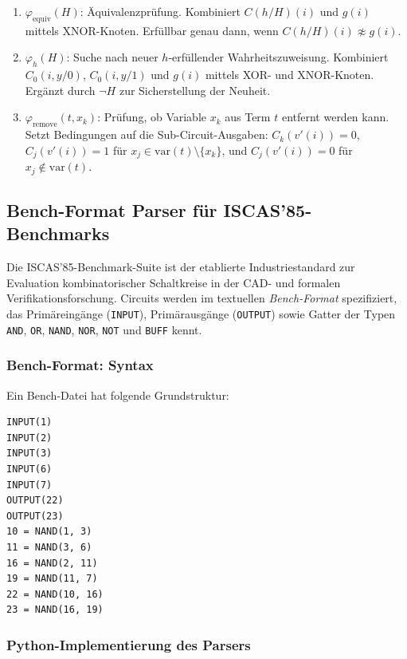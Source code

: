 ﻿\documentclass[a4paper,12pt]{article}
\theoremstyle{definition}
\begin{document}
\begin{enumerate}
    \item \textbf{$\varphi_{\text{equiv}}(H)$}: Äquivalenzprüfung. Kombiniert $C(h/H)(i)$ und $g(i)$ mittels XNOR-Knoten. Erfüllbar genau dann, wenn $C(h/H)(i) \not\approx g(i)$.
    
    \item \textbf{$\varphi_h(H)$}: Suche nach neuer $h$-erfüllender Wahrheitszuweisung. Kombiniert $C_0(i, y/0)$, $C_0(i, y/1)$ und $g(i)$ mittels XOR- und XNOR-Knoten. Ergänzt durch $\neg H$ zur Sicherstellung der Neuheit.
    
    \item \textbf{$\varphi_{\text{remove}}(t, x_k)$}: Prüfung, ob Variable $x_k$ aus Term $t$ entfernt werden kann. Setzt Bedingungen auf die Sub-Circuit-Ausgaben: $C_k(v'(i)) = 0$, $C_j(v'(i)) = 1$ für $x_j \in \text{var}(t) \setminus \{x_k\}$, und $C_j(v'(i)) = 0$ für $x_j \notin \text{var}(t)$.
\end{enumerate}

\subsection{Bench-Format Parser für ISCAS'85-Benchmarks}
\label{subsec:bench-parser}

Die ISCAS'85-Benchmark-Suite \cite{Brglez85} ist der etablierte Industriestandard
zur Evaluation kombinatorischer Schaltkreise in der CAD- und formalen
Verifikationsforschung.  Circuits werden im textuellen \emph{Bench-Format}
spezifiziert, das Primäreingänge (\texttt{INPUT}), Primärausgänge
(\texttt{OUTPUT}) sowie Gatter der Typen \texttt{AND}, \texttt{OR},
\texttt{NAND}, \texttt{NOR}, \texttt{NOT} und \texttt{BUFF} kennt.

\subsubsection{Bench-Format: Syntax}

Ein Bench-Datei hat folgende Grundstruktur:
\begin{lstlisting}[language={},caption={Bench-Format -- Minimalbeispiel (c17)}]
INPUT(1)
INPUT(2)
INPUT(3)
INPUT(6)
INPUT(7)
OUTPUT(22)
OUTPUT(23)
10 = NAND(1, 3)
11 = NAND(3, 6)
16 = NAND(2, 11)
19 = NAND(11, 7)
22 = NAND(10, 16)
23 = NAND(16, 19)
\end{lstlisting}

\subsubsection{Python-Implementierung des Parsers}
\end{document}
